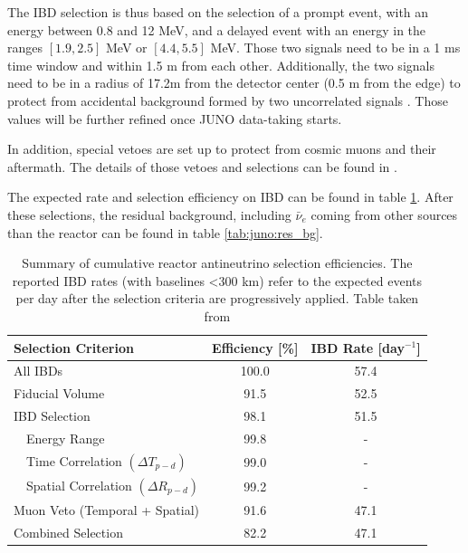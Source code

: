\documentclass[../main.tex]{subfiles}
\begin{document}
The IBD selection is thus based on the selection of a prompt event, with an energy between 0.8 and 12 MeV, and a delayed event with an energy in the ranges $[1.9, 2.5]$ MeV or $[4.4, 5.5]$ MeV. Those two signals need to be in a 1 ms time window and within 1.5 m from each other. Additionally, the two signals need to be in a radius of 17.2m from the detector center (0.5 m from the edge) to protect from accidental background formed by two uncorrelated signals \cite{abusleme_potential_2024}. Those values will be further refined once JUNO data-taking starts.

In addition, special vetoes are set up to protect from cosmic muons and their aftermath. The details of those vetoes and selections can be found in \cite{abusleme_potential_2024}.

The expected rate and selection efficiency on IBD can be found in table \ref{tab:juno:ibd_selection}. After these selections, the residual background, including $\bar{\nu}_e$ coming from other sources than the reactor can be found in table \ref{tab:juno:res_bg}.

\begin{table}[ht]
  \centering
  \begin{tabular}{l|c|c}
    \hline
    Selection Criterion & Efficiency [\%] & IBD Rate [day$^{-1}$] \\
    \hline
    All IBDs            & 100.0           & 57.4 \\
    Fiducial Volume     & 91.5            & 52.5 \\
    IBD Selection       & 98.1            & 51.5 \\
    ~~Energy Range      & 99.8            & - \\
    ~~Time Correlation $(\Delta T_{p - d})$    & 99.0    & - \\
    ~~Spatial Correlation $(\Delta R_{p - d})$ & 99.2    & - \\
    Muon Veto (Temporal + Spatial)        & 91.6    & 47.1 \\
    \hline
    Combined Selection & 82.2             &47.1 \\
    \hline
  \end{tabular}
  \caption{Summary of cumulative reactor antineutrino selection efficiencies. The reported IBD rates (with baselines <300 km) refer to the expected events per day after the selection criteria are progressively applied. Table taken from \cite{abusleme_potential_2024}}
  \label{tab:juno:ibd_selection}
\end{table}
\end{document}
